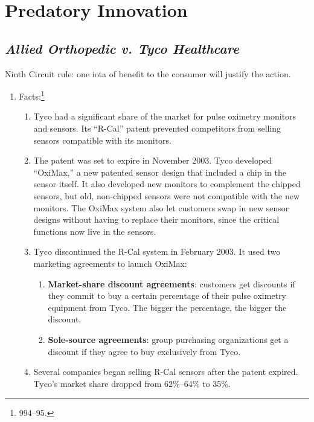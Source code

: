 \section{Predatory Innovation}

\subsection{\emph{Allied Orthopedic v. Tyco Healthcare}}

Ninth Circuit rule: one iota of benefit to the consumer will justify the 
action.

\begin{enumerate}
    \item Facts:\footnote{994--95.}
    \begin{enumerate}
        \item Tyco had a significant share of the market for pulse oximetry 
        monitors and sensors. Its ``R-Cal'' patent prevented competitors from 
        selling sensors compatible with its monitors.
        \item The patent was set to expire in November 2003. Tyco developed 
        ``OxiMax,'' a new patented sensor design that included a chip in the 
        sensor itself. It also developed new monitors to complement the 
        chipped sensors, but old, non-chipped sensors were not compatible with 
        the new monitors. The OxiMax system also let customers swap in new 
        sensor designs without having to replace their monitors, since the 
        critical functions now live in the sensors.
        \item Tyco discontinued the R-Cal system in February 2003. It used two 
        marketing agreements to launch OxiMax:
        \begin{enumerate}
            \item \textbf{Market-share discount agreements}: customers get 
            discounts if they commit to buy a certain percentage of their 
            pulse oximetry equipment from Tyco. The bigger the percentage, the 
            bigger the discount.
            \item \textbf{Sole-source agreements}: group purchasing 
            organizations get a discount if they agree to buy exclusively from 
            Tyco.
        \end{enumerate}
        \item Several companies began selling R-Cal sensors after the patent 
        expired. Tyco's market share dropped from 62\%--64\% to 35\%.

\end{enumerate}
\end{enumerate}
